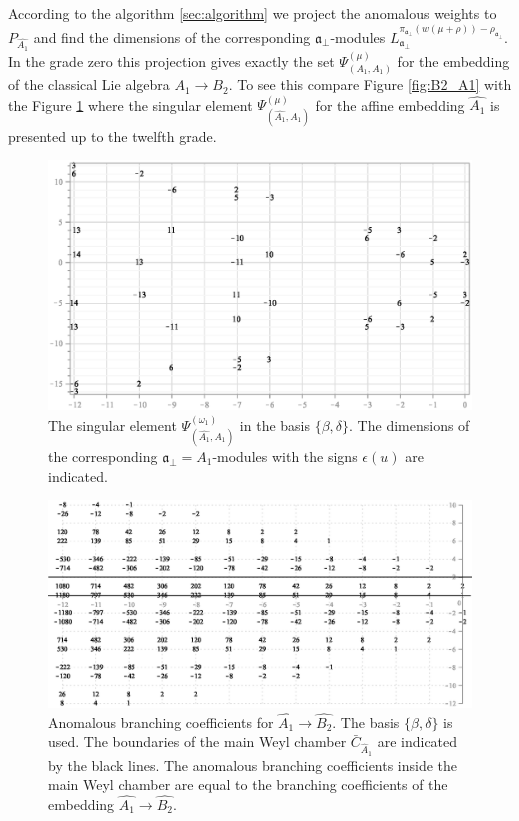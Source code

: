 \documentclass[12pt]{iopart}
\theoremstyle{definition}
\newcommand{\afb}{\mathfrak{a}_{\bot}}
\begin{document}
According to the algorithm \ref{sec:algorithm} we project the anomalous weights to
$P_{\hat{A_1}}$ and find the dimensions of the corresponding
$\afb$-modules $L^{\pi_{\afb}(w(\mu+\rho))-\rho_{\afb}}_{\afb}$.
In the grade zero this projection gives exactly the set
$\Psi ^{\left( \mu \right) }_{\left(  A_1, A_1 \right)}$ for the embedding of
the classical Lie algebra $A_1\rightarrow B_2$. To see this compare Figure \ref{fig:B2_A1}
with the Figure \ref{fig:AffineB2_A1_anom_proj}
where the singular element $\Psi ^{\left( \mu \right) }_{\left(  \widehat{A_1}, A_1 \right)}$
for the affine embedding $\hat{A_1}$ is presented up to the twelfth grade.
\begin{figure}[h!tb]
  \centering
  \includegraphics[width=120mm]{figure12.eps}
  \caption{The singular element $\Psi ^{\left( \omega_1 \right) }_{\left(  \widehat{A_1}, A_1 \right)}$
  in the basis $\{\beta,\delta\}$. The dimensions of the corresponding $\afb=A_1$-modules
  with the signs $\epsilon(u)$ are indicated.}
  \label{fig:AffineB2_A1_anom_proj}
\end{figure}

\begin{figure}[h!bt]
  \centering
  \includegraphics[width=120mm]{figure13.eps}
  \caption{Anomalous branching coefficients for $\hat{A_1}\rightarrow \hat{B_2}$. The basis $\{\beta,\delta\}$ is used.
  The boundaries  of the main Weyl chamber $\bar{C}_{\hat{A}_1}$
 are indicated by the black lines. The anomalous branching coefficients
 inside the main Weyl chamber are equal to the branching coefficients of the embedding $\hat{A_1}\rightarrow \hat{B_2}$.}
  \label{fig:AffineB2_A1_branching}
\end{figure}
\end{document}
